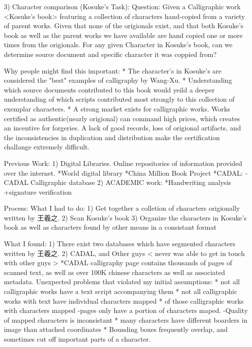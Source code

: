 3)  Character comparison (Kosuke's Task):
    Question:   Given a Calligraphic work <Kosuke's book> featuring a collection of characters hand-copied from a variety of parent works.
                Given that none of the origionals exist, and that both Kosuke's book as well as the parent works we have available are hand copied one or more times from the origionals.
                For any given Character in Kosuke's book, can we determine source document and specific character it was coppied from?
                
Why people might find this important:
    *  The character's in Kosuke's are considered the "best" examples of calligraphy by Wang-Xu.
    *  Understanding which source documents contributed to this book would yeild a deeper understanding of which scripts contributed most strongly to this collection of exemplar characters.
    *  A strong market exists for calligraphic works.  Works certified as authentic(nearly origional) can command high prices, which creates an incentive for forgeries.  A lack of good records, loss of origional artifacts, and the inconsistencies in duplication and distribution make the certification challange extremely difficult.
    
Previous Work:
    1) Digital Libraries.  Online repositories of information provided over the internet.
        *World digital library
        *China Million Book Project
            *CADAL:
                -CADAL Calligraphic database
    2) ACADEMIC work:
        *Handwriting analysis
            +signature verification
            

Process:  What I had to do:
    1)  Get together a colletion of characters origionally written by 王羲之.
    2)  Scan Kosuke's book
    3)  Organize the characters in Kosuke's book as well as characters found by other means in a consistant format 
    
What I found:
    1)  There exist two databases which have segmented characters written by 王羲之.
    2)  CADAL, and Other guys < never was able to get in touch with other guys >
        *CADAL calligraphy page contains thousands of pages of scanned text, as well as over 100K chinese characters as well as associated metadata.
    Unexpected problems that violated my initial assumptions:
        * not all calligraphic works have a text script accompanying them
        * not all calligraphic works with text have individual characters mapped
        * of those calligraphic works with characters mapped
            -pages only have a portion of characters maped.
            -Quality of mapped characters is inconsistant
                * many characters have different boarders in image than attached coordinates
                * Bounding boxes frequently overlap, and sometimes cut off important parts of a character.

